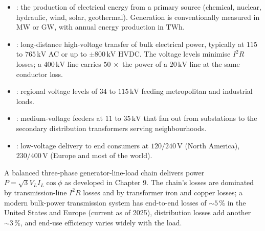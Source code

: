 \begin{itemize}[leftmargin=*]
  \item {}: the production of electrical energy from
    a primary source (chemical, nuclear, hydraulic, wind, solar,
    geothermal). Generation is conventionally measured in
    $\si{\mega\watt}$ or $\si{\giga\watt}$, with annual energy
    production in $\si{\tera\watt\hour}$.
  \item {}: long-distance high-voltage transfer of
    bulk electrical power, typically at $115$ to $765\,\si{\kilo\volt}$
    AC or up to $\pm 800\,\si{\kilo\volt}$ HVDC. The voltage levels
    minimise $I^{2}R$ losses; a $400\,\si{\kilo\volt}$ line carries
    $50\,\si{\times}$ the power of a $20\,\si{\kilo\volt}$ line at the
    same conductor loss.
  \item {}: regional voltage levels of $34$ to
    $115\,\si{\kilo\volt}$ feeding metropolitan and industrial loads.
  \item {}: medium-voltage feeders at $11$ to
    $35\,\si{\kilo\volt}$ that fan out from substations to the
    secondary distribution transformers serving neighbourhoods.
  \item {}: low-voltage delivery to end consumers at
    $120/240\,\si{\volt}$ (North America), $230/400\,\si{\volt}$
    (Europe and most of the world).
\end{itemize}

A balanced three-phase generator-line-load chain delivers power
$P = \sqrt{3}V_{L}I_{L}\cos\phi$ as developed in Chapter 9. The
chain's losses are dominated by transmission-line $I^{2}R$ losses and
by transformer iron and copper losses; a modern bulk-power
transmission system has end-to-end losses of $\sim 5\,\%$ in the
United States and Europe (current as of 2025), distribution losses
add another $\sim 3\,\%$, and end-use efficiency varies widely with
the load.

